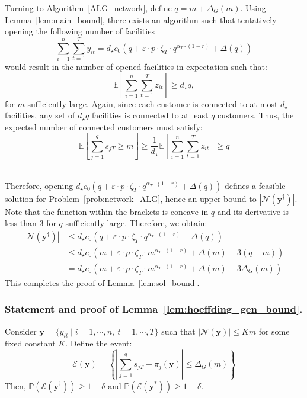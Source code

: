 \documentclass[nonblindrev]{informs3noheader}
\def\E{\mathbb{E}}
\def\P{\mathbb{P}}
\def\calE{\mathcal{E}}
\def\calN{\mathcal{N}}
\def\by{\boldsymbol{y}}
\begin{document}
Turning to Algorithm~\ref{ALG_network}, define $q=m+\Delta_G(m)$. Using Lemma~\ref{lem:main_bound}, there exists an algorithm such that tentatively opening the following number of facilities
$$\sum_{i=1}^n \sum_{t=1}^T y_{it}=d_\star c_0 \left(q + \varepsilon\cdot p \cdot\zeta_T\cdot q^{\alpha_T\cdot(1-r)} + \Delta(q)\right)$$
would result in the number of opened facilities in expectation such that:
\[\E\left[\sum_{i=1}^n \sum_{t=1}^T z_{it}\right]  \geq d_\star q,\]
for $m$ sufficiently large. Again, since each customer is connected to at most $d_\star$ facilities, any set of $d_\star q$ facilities is connected to at least $q$ customers. Thus, the expected number of connected customers must satisfy:
\[\E\left[\sum_{j=1}^q s_{jT} \geq m\right]\geq\frac{1}{d_\star}\E\left[\sum_{i=1}^n \sum_{t=1}^T z_{it}\right]\geq q\]\

Therefore, opening $d_\star c_0 \left(q + \varepsilon\cdot p \cdot\zeta_T\cdot q^{\alpha_T\cdot(1-r)} + \Delta(q) \right)$ defines a feasible solution for Problem~\eqref{prob:network_ALG}, hence an upper bound to $|\calN(\by^\dagger)|$. Note that the function within the brackets is concave in $q$ and its derivative is less than 3 for $q$ sufficiently large. Therefore, we obtain:
\begin{align*}
    |\calN(\by^\dagger)|&\leq d_\star c_0 \left(q + \varepsilon\cdot p \cdot \zeta_T\cdot q^{\alpha_T\cdot(1-r)} + \Delta(q)\right)\\
    &\leq d_\star c_0 \left(m + \varepsilon\cdot p \cdot\zeta_T\cdot m^{\alpha_T\cdot(1-r)} + \Delta(m)+3(q-m)\right)\\
    &= d_\star c_0 \left(m + \varepsilon\cdot p \cdot\zeta_T\cdot m^{\alpha_T\cdot(1-r)}+ \Delta(m)+3\Delta_G(m)\right)
\end{align*}
This completes the proof of Lemma~\ref{lem:sol_bound}.
\hfill\Halmos

\subsubsection*{Statement and proof of Lemma~\ref{lem:hoeffding_gen_bound}.}

\begin{lemma}\label{lem:hoeffding_gen_bound}
   Consider $\by=\{y_{it}\mid i=1,\cdots,n,\ t=1,\cdots,T\}$ such that $|\calN(\by)|\leq Km$ for some fixed constant $K$. Define the event:
   \begin{equation}
    \calE(\by)=\left\{\left|\sum_{j=1}^q s_{jT} - \pi_{j}(\by)\right|\leq \Delta_G(m)\right\}	\label{eq:Ek_gen}
    \end{equation}
    Then, $\P(\calE(\by^\dagger))\geq 1-\delta$ and $\P(\calE(\by^*))\geq 1-\delta$.
\end{lemma}
\end{document}

